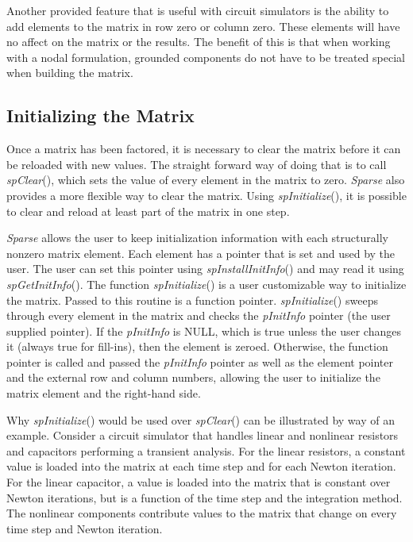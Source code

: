 \documentclass[11pt]{article}
\begin{document}
Another provided feature that is useful with circuit simulators is the
ability to add elements to the matrix in row zero or column zero.
These elements will have no affect on the matrix or the results.  The
benefit of this is that when working with a nodal formulation, grounded 
components do not have to be treated special when building the matrix.

\subsection{Initializing the Matrix}
Once a matrix has been factored, it is necessary to clear the matrix
before it can be reloaded with new values.  The straight forward way of
doing that is to call \emph{spClear}(), which sets the value of every
element in the matrix to zero.  \emph{Sparse} also provides a more
flexible way to clear the matrix.  Using \emph{spInitialize}(), it is
possible to clear and reload at least part of the matrix in one step.

\emph{Sparse} allows the user to keep initialization information with
each structurally nonzero matrix element.  Each element has a pointer
that is set and used by the user.  The user can set this pointer using
\emph{spInstallInitInfo}() and may read it using \emph{spGetInitInfo}().
The function \emph{spInitialize}() is a user customizable way to
initialize the matrix.  Passed to this routine is a function pointer.
\emph{spInitialize}() sweeps through every element in the matrix and
checks the \emph{pInitInfo} pointer (the user supplied pointer).  If the
\emph{pInitInfo} is NULL, which is true unless the user changes it
(always true for fill-ins), then the element is zeroed.  Otherwise, the
function pointer is called and passed the \emph{pInitInfo} pointer as
well as the element pointer and the external row and column numbers,
allowing the user to initialize the matrix element and the right-hand
side.

Why \emph{spInitialize}() would be used over \emph{spClear}() can be
illustrated by way of an example.  Consider a circuit simulator that
handles linear and nonlinear resistors and capacitors performing a
transient analysis.  For the linear resistors, a constant value is
loaded into the matrix at each time step and for each Newton
iteration.  For the linear capacitor, a value is loaded into the matrix
that is constant over Newton iterations, but is a function of the time
step and the integration method.  The nonlinear components contribute
values to the matrix that change on every time step and Newton
iteration.
\end{document}
